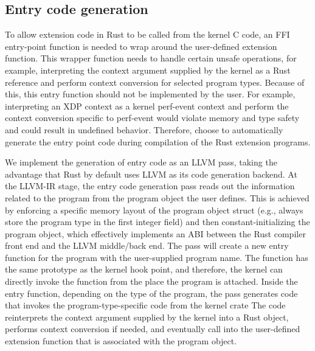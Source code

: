 \subsection{Entry code generation}
To allow \projname{} extension code in Rust to be called from the kernel C
    code, an FFI entry-point function is needed to wrap around the user-defined
    extension function.
This wrapper function needs to handle certain unsafe operations, for example,
    interpreting the context argument supplied by the kernel as a Rust
    reference and perform context conversion for selected program types.
Because of this, this entry function should not be implemented by the user.
For example, interpreting an XDP context as a kernel perf-event context and
    perform the context conversion specific to perf-event would violate memory
    and type safety and could result in undefined behavior.
Therefore, \projname{} choose to automatically generate the entry point code
    during compilation of the Rust extension programs.

We implement the generation of entry code as an LLVM pass, taking the advantage
    that Rust by default uses LLVM as its code generation backend.
At the LLVM-IR stage, the entry code generation pass reads out the information
    related to the program from the program object the user defines.
This is achieved by enforcing a specific memory layout of the program object
    struct (e.g., always store the program type in the first integer field) and
    then constant-initializing the program object, which effectively implements
    an ABI between the Rust compiler front end and the LLVM middle/back end.
The pass will create a new entry function for the program with the
    user-supplied program name.
The function has the same prototype as the kernel hook point, and therefore,
    the kernel can directly invoke the function from the place the program is
    attached.
Inside the entry function, depending on the type of the program, the pass
    generates code that invokes the program-type-specific code from the
    \projname{} kernel crate
The code reinterprets the context argument supplied by the kernel into a Rust
    object, performs context conversion if needed, and eventually call into the
    user-defined extension function that is associated with the \projname{}
    program object.


